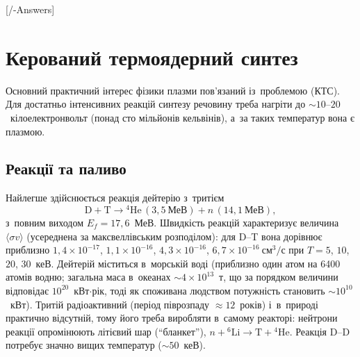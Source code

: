 

\graphicspath{{\currfilebase/Pictures}}

[\currfilebase/\currfilebase-Answers]
\chapter{Керований термоядерний синтез}\label{sec:fusion}\hypertarget{fusion}{}

Основний практичний інтерес фізики плазми пов'язаний із~проблемою  (КТС). Для достатньо інтенсивних реакцій синтезу речовину треба
нагріти до $\sim10$--$20$~кілоелектронвольт (понад сто мільйонів кельвінів), а~за таких температур вона є плазмою.

\section{Реакції та паливо}

Найлегше здійснюється реакція дейтерію з~тритієм
\begin{equation*}
	\mathrm D+\mathrm T\to{}^4\mathrm{He}\,(3{,}5~\text{МеВ})+n\,(14{,}1~\text{МеВ}),
\end{equation*}
з~повним виходом $E_f=17{,}6$~МеВ. Швидкість реакцій характеризує величина $\langle\sigma
v\rangle$ (усереднена за максвеллівським розподілом): для D--T вона дорівнює приблизно
$1{,}4\times10^{-17}$, $1{,}1\times10^{-16}$, $4{,}3\times10^{-16}$,
$6{,}7\times10^{-16}~\mathrm{см}^3/\mathrm{с}$ при $T=5$, $10$, $20$,
$30$~кеВ. Дейтерій міститься в~морській воді (приблизно один атом на 6400 атомів водню;
загальна маса в~океанах $\sim4\times10^{13}$~т, що за порядком величини відповідає
$10^{20}$~кВт$\cdot$рік, тоді як споживана людством потужність становить
$\sim10^{10}$~кВт). Тритій радіоактивний (період піврозпаду $\approx12$~років) і~в~природі
практично відсутній, тому його треба виробляти в~самому реакторі: нейтрони реакції
опромінюють літієвий шар (\enquote{бланкет}), $n+{}^6\mathrm{Li}\to\mathrm
T+{}^4\mathrm{He}$. Реакція D--D потребує значно вищих температур ($\sim50$~кеВ).

